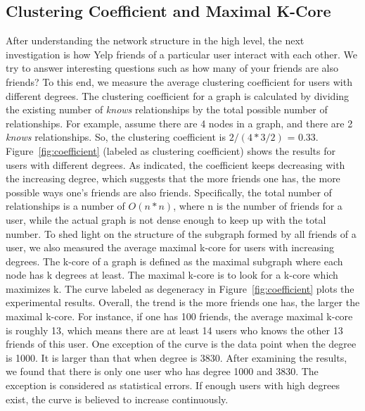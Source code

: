 \documentclass[11pt, oneside]{article}   	%
\begin{document}
\subsection{Clustering Coefficient and Maximal K-Core}
After understanding the network structure in the high level, the next investigation is how Yelp friends of a particular user 
interact with each other. We try to answer interesting questions such as how many of your friends are also friends? To this 
end, we measure the average clustering coefficient for users with different degrees. The clustering coefficient for a 
graph is calculated by dividing the existing number of  \textit{knows} relationships by the total possible number 
of relationships. For example, assume there are  4 nodes in a graph, and there are  2 \textit{knows} relationships. 
So, the clustering coefficient is $2 / (4*3/2)$ = 0.33. Figure~\ref{fig:coefficient} (labeled as clustering coefficient) shows the results 
for users with different degrees.  As indicated, the coefficient keeps decreasing with the increasing degree, which 
suggests that the more friends one has, the more possible ways one's friends are also friends. Specifically, the total 
number of relationships is a number of $O(n*n)$, where n is the number of friends for a user, while the actual graph is 
not dense enough to keep up with the total number. To shed light on the structure of the subgraph formed by all friends of 
a user, we also measured the average maximal k-core for users with increasing degrees. The k-core of a graph is defined 
as the maximal subgraph where each node has k degrees at least. The maximal k-core is to look for a k-core 
which maximizes k.  The curve labeled as degeneracy in Figure~\ref{fig:coefficient} plots the experimental results. 
Overall, the trend is the more friends 
one has, the larger the maximal k-core. For instance, if one has 100 friends, the average maximal k-core is roughly 13,
which means there are at least 14 users who knows the other 13 friends of this user.  One exception of the curve is 
the data point when the degree is 1000. It is larger than that when degree is 3830. After examining the results, we found
that there is only one user who has degree 1000 and 3830. The exception is considered as statistical errors. If enough 
users with high degrees exist, the curve is believed to increase continuously. 
\end{document}
